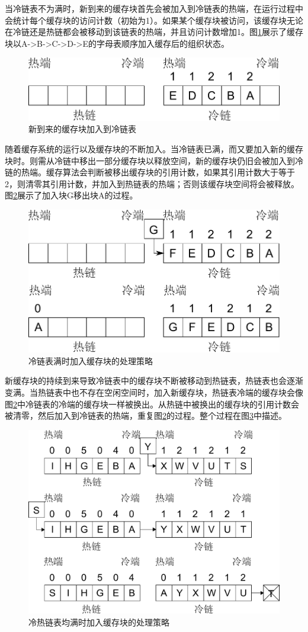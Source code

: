 当冷链表不为满时，新到来的缓存块首先会被加入到冷链表的热端，在运行过程中会统计每个缓存块的访问计数（初始为1）。如果某个缓存块被访问，该缓存块无论在冷链还是热链都会被移动到该链表的热端，并且访问计数增加1。图\ref{fig:replace-algo-2}展示了缓存块以A->B->C->D->E的字母表顺序加入缓存后的组织状态。
\begin{figure}[H]
\centering
\includegraphics[width=0.6\linewidth]{./graph/replace-algo-2}
\caption{新到来的缓存块加入到冷链表}
\label{fig:replace-algo-2}
\end{figure}

随着缓存系统的运行以及缓存块的不断加入。当冷链表已满，而又要加入新的缓存块时。则需从冷链中移出一部分缓存块以释放空间，新的缓存块仍旧会被加入到冷链的热端。缓存算法会判断被移出缓存块的引用计数，如果其引用计数大于等于2，则清零其引用计数，并加入到热链表的热端；否则该缓存块空间将会被释放。图\ref{fig:replace-algo-3}展示了加入块G移出块A的过程。
\begin{figure}[H]
\centering
\includegraphics[width=0.6\linewidth]{./graph/replace-algo-3}
\caption{冷链表满时加入缓存块的处理策略}
\label{fig:replace-algo-3}
\end{figure}

新缓存块的持续到来导致冷链表中的缓存块不断被移动到热链表，热链表也会逐渐变满。当热链表中也不存在空闲空间时，加入新缓存块，热链表冷端的缓存块会像图\ref{fig:replace-algo-3}中冷链表的冷端的缓存块一样被换出。从热链中被换出的缓存块的引用计数会被清零，然后加入到冷链表的热端，重复图\ref{fig:replace-algo-3}的过程。整个过程在图\ref{fig:replace-algo-4}中描述。
\begin{figure}[H]
\centering
\includegraphics[width=0.7\linewidth]{./graph/replace-algo-4}
\caption{冷热链表均满时加入缓存块的处理策略}
\label{fig:replace-algo-4}
\end{figure}

